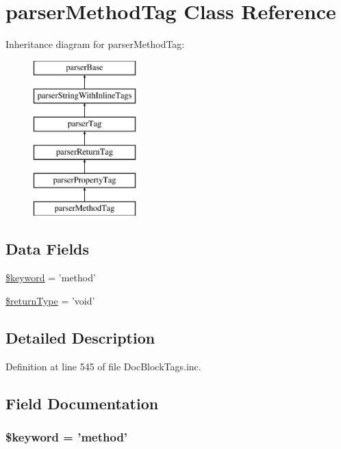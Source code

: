 \hypertarget{classparser_method_tag}{\section{parser\-Method\-Tag \-Class \-Reference}
\label{classparser_method_tag}
}
\-Inheritance diagram for parser\-Method\-Tag\-:\begin{figure}[H]
\begin{center}
\leavevmode
\includegraphics[height=6.000000cm]{classparser_method_tag}
\end{center}
\end{figure}
\subsection*{\-Data \-Fields}
\begin{DoxyCompactItemize}
\item 
\hyperlink{classparser_method_tag_a4a925d6b38bcf3957c713a7d3dc7da1f}{\$keyword} = 'method'
\item 
\hyperlink{classparser_method_tag_a0f317c2c1d4c617554890223a39037be}{\$return\-Type} = 'void'
\end{DoxyCompactItemize}


\subsection{\-Detailed \-Description}


\-Definition at line 545 of file \-Doc\-Block\-Tags.\-inc.



\subsection{\-Field \-Documentation}
\hypertarget{classparser_method_tag_a4a925d6b38bcf3957c713a7d3dc7da1f}{
\subsubsection[{\$keyword}]{\setlength{\rightskip}{0pt plus 5cm}\$keyword = 'method'}}\label{classparser_method_tag_a4a925d6b38bcf3957c713a7d3dc7da1f}



